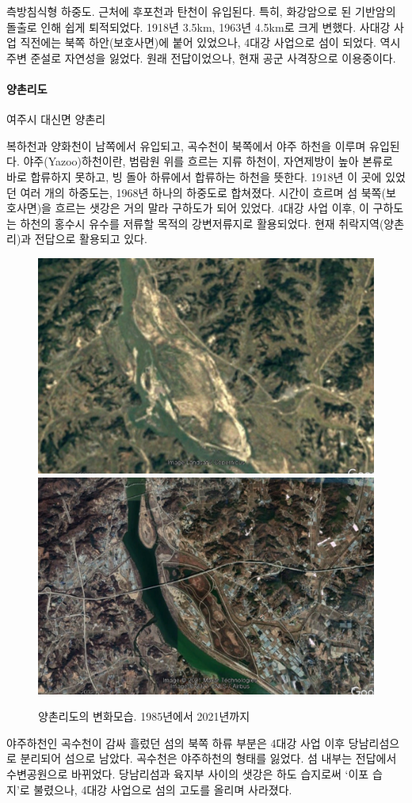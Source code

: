 측방침식형 하중도. 근처에 후포천과 탄천이 유입된다. 특히, 화강암으로 된 기반암의 돌출로 인해 쉽게 퇴적되었다.
1918년 3.5km, 1963년 4.5km로 크게 변했다. 사대강 사업 직전에는 북쪽 하안(보호사면)에 붙어 있었으나, 4대강 사업으로 섬이 되었다.
역시 주변 준설로 자연성을 잃었다.
원래 전답이었으나, 현재 공군 사격장으로 이용중이다.


\paragraph{양촌리도}
여주시 대신면 양촌리

복하천과 양화천이 남쪽에서 유입되고, 곡수천이 북쪽에서 야주 하천을 이루며 유입된다.
야주(Yazoo)하천이란, 범람원 위를 흐르는 지류 하천이, 자연제방이 높아 본류로 바로 합류하지 못하고, 빙 돌아 하류에서 합류하는 하천을 뜻한다.
1918년 이 곳에 있었던 여러 개의 하중도는, 1968년 하나의 하중도로 합쳐졌다. 
시간이 흐르며 섬 북쪽(보호사면)을 흐르는 샛강은 거의 말라 구하도가 되어 있었다.
4대강 사업 이후, 이 구하도는 하천의 홍수시 유수를 저류할 목적의 강변저류지로 활용되었다. 
현재 취락지역(양촌리)과 전답으로 활용되고 있다. 


\begin{figure}[ht]
    \centering
    \includegraphics[width=.45\textwidth]{img/양촌리 1985.jpg}
    \includegraphics[width=.45\textwidth]{img/양촌리 2021.jpg}
    \caption{양촌리도의 변화모습. 1985년에서 2021년까지 }
    \label{fig:my_labe613}
\end{figure}


야주하천인 곡수천이 감싸 흘렀던 섬의 북쪽 하류 부분은 4대강 사업 이후 당남리섬으로 분리되어 섬으로 남았다. 
곡수천은 야주하천의 형태를 잃었다. 섬 내부는 전답에서 수변공원으로 바뀌었다.
당남리섬과 육지부 사이의 샛강은 하도 습지로써 `이포 습지'로 불렸으나, 4대강 사업으로 섬의 고도를 올리며 사라졌다.

